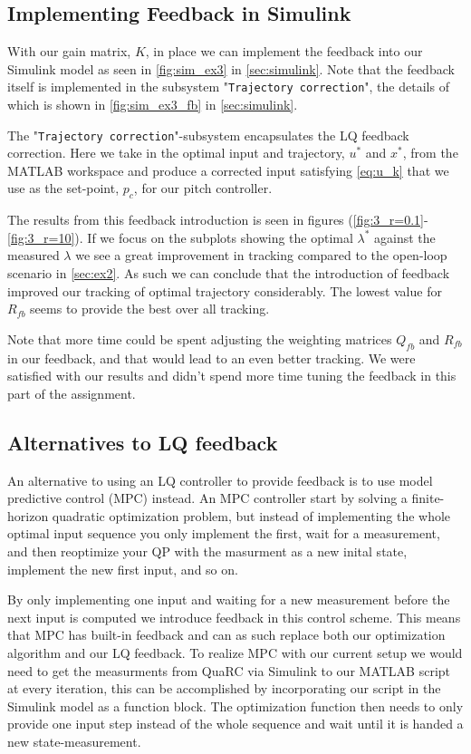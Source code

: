 \subsection{Implementing Feedback in Simulink}
With our gain matrix, $K$, in place we can implement the feedback into our Simulink model as seen in \cref{fig:sim_ex3} in \cref{sec:simulink}. Note that the feedback itself is implemented in the subsystem "\texttt{Trajectory correction}", the details of which is shown in \cref{fig:sim_ex3_fb} in \cref{sec:simulink}.

The "\texttt{Trajectory correction}"-subsystem encapsulates the LQ feedback correction. Here we take in the optimal input and trajectory, $u^*$ and $x^*$, from the MATLAB workspace and produce a corrected input satisfying \cref{eq:u_k} that we use as the set-point, $p_c$, for our pitch controller.

The results from this feedback introduction is seen in figures (\ref{fig:3_r=0.1}-\ref{fig:3_r=10}). If we focus on the subplots showing the optimal $\lambda^*$ against the measured $\lambda$ we see a great improvement in tracking compared to the open-loop scenario in \cref{sec:ex2}. As such we can conclude that the introduction of feedback improved our tracking of optimal trajectory considerably. The lowest value for $R_{fb}$ seems to provide the best  over all tracking.

Note that more time could be spent adjusting the weighting matrices $Q_{fb}$ and $R_{fb}$ in our feedback, and that would lead to an even better tracking. We were satisfied with our results and didn't spend more time tuning the feedback in this part of the assignment. 

\subsection{Alternatives to LQ feedback}
An alternative to using an LQ controller to provide feedback is to use model predictive control (MPC) instead. An MPC controller start by solving a finite-horizon quadratic optimization problem, but instead of implementing the whole optimal input sequence you only implement the first, wait for a measurement, and then reoptimize your QP with the masurment as a new inital state, implement the new first input, and so on.

By only implementing one input and waiting for a new measurement before the next input is computed we introduce feedback in this control scheme. This means that MPC has built-in feedback and can as such replace both our optimization algorithm and our LQ feedback. To realize MPC with our current setup we would need to get the measurments from QuaRC via Simulink to our MATLAB script at every iteration, this can be accomplished by incorporating our script in the Simulink model as a function block. The optimization function then needs to only provide one input step instead of the whole sequence and wait until it is handed a new state-measurement.

